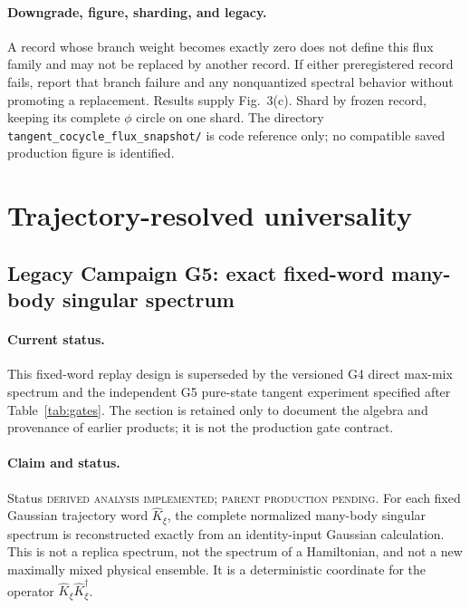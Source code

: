 \documentclass[aps,prx,twocolumn,floatfix,nofootinbib,superscriptaddress,longbibliography]{revtex4-2}
\newcommand{\code}[1]{\texttt{#1}}
\begin{document}
\paragraph*{Downgrade, figure, sharding, and legacy.}
A record whose branch weight becomes exactly zero does not define this flux family and may
not be replaced by another record.  If either preregistered record fails, report that
branch failure and any nonquantized spectral behavior without promoting a replacement.
Results supply Fig.~3(c).  Shard by frozen record,
keeping its complete $\phi$ circle on one shard.  The directory
\code{tangent\_cocycle\_flux\_snapshot/} is code reference only; no compatible saved
production figure is identified.

\section{Trajectory-resolved universality}

\subsection{Legacy Campaign G5: exact fixed-word many-body singular spectrum}
\label{camp:G5}
\paragraph*{Current status.}
This fixed-word replay design is superseded by the versioned G4 direct max-mix spectrum and
the independent G5 pure-state tangent experiment specified after
Table~\ref{tab:gates}.  The section is retained only to document the algebra and provenance
of earlier products; it is not the production gate contract.
\paragraph*{Claim and status.}
Status \textsc{derived analysis implemented; parent production pending}.  For each fixed
Gaussian trajectory word $\widehat K_\xi$, the complete normalized many-body singular
spectrum is reconstructed exactly from an identity-input Gaussian calculation.  This is
not a replica spectrum, not the spectrum of a Hamiltonian, and not a new maximally mixed
physical ensemble.  It is a deterministic coordinate for the operator
$\widehat K_\xi\widehat K_\xi^\dagger$.
\end{document}
